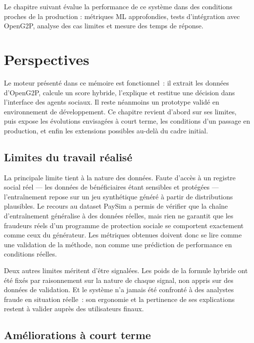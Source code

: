 \documentclass[a4paper, oneside, 12pt]{book}
\begin{document}
\hspace{0.5cm}Le chapitre suivant évalue la performance de ce système dans des conditions proches de la production : métriques ML approfondies, tests d'intégration avec OpenG2P, analyse des cas limites et mesure des temps de réponse.

\chapter{Perspectives}

\hspace{0.5cm}Le moteur présenté dans ce mémoire est fonctionnel~: il extrait les données d'OpenG2P, calcule un score hybride, l'explique et restitue une décision dans l'interface des agents sociaux. Il reste néanmoins un prototype validé en environnement de développement. Ce chapitre revient d'abord sur ses limites, puis expose les évolutions envisagées à court terme, les conditions d'un passage en production, et enfin les extensions possibles au-delà du cadre initial.

\section{Limites du travail réalisé}

\hspace{0.5cm}La principale limite tient à la nature des données. Faute d'accès à un registre social réel — les données de bénéficiaires étant sensibles et protégées — l'entraînement repose sur un jeu synthétique généré à partir de distributions plausibles. Le recours au dataset PaySim a permis de vérifier que la chaîne d'entraînement généralise à des données réelles, mais rien ne garantit que les fraudeurs réels d'un programme de protection sociale se comportent exactement comme ceux du générateur. Les métriques obtenues doivent donc se lire comme une validation de la méthode, non comme une prédiction de performance en conditions réelles.

\hspace{0.5cm}Deux autres limites méritent d'être signalées. Les poids de la formule hybride ont été fixés par raisonnement sur la nature de chaque signal, non appris sur des données de validation. Et le système n'a jamais été confronté à des analystes fraude en situation réelle~: son ergonomie et la pertinence de ses explications restent à valider auprès des utilisateurs finaux.

\section{Améliorations à court terme}
\end{document}
